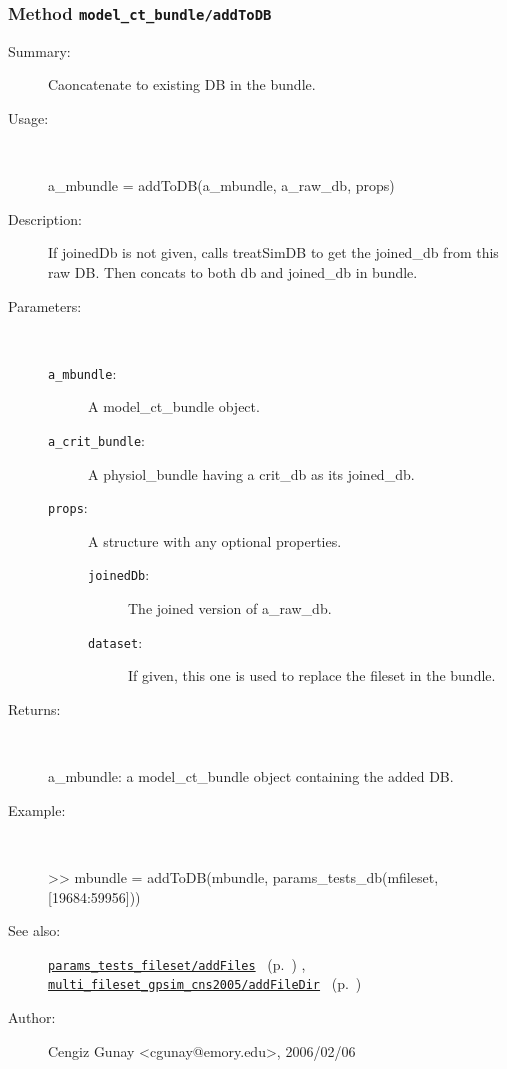 \subsubsection[Method \texttt{addToDB}]{Method \texttt{model\_ct\_bundle/addToDB}}%
%
\label{ref_model_ct_bundle__addToDB}%
\hypertarget{ref_model_ct_bundle__addToDB}{}%
\begin{description}
\item[Summary:]Caoncatenate to existing DB in the bundle.
%
\item[Usage:]~%
\begin{lyxcode}%
a\_mbundle = addToDB(a\_mbundle, a\_raw\_db, props)
%
\end{lyxcode}%
%
\item[Description:]%
If joinedDb is not given, calls treatSimDB to get the joined\_db from this raw DB. 
 Then concats to both db and joined\_db in bundle.
\item[Parameters:]~
\begin{description}%
\item[\texttt{a\_mbundle}:]
 A model\_ct\_bundle object.
\item[\texttt{a\_crit\_bundle}:]
 A physiol\_bundle having a crit\_db as its joined\_db.
\item[\texttt{props}:]
 A structure with any optional properties.
\begin{description}%
\item[\texttt{joinedDb}:]
 The joined version of a\_raw\_db.
\item[\texttt{dataset}:]
 If given, this one is used to replace the fileset in the bundle.
\end{description}%
\end{description}%
%
\item[Returns:]~

	a\_mbundle: a model\_ct\_bundle object containing the added DB.
%
\item[Example:]~
\begin{lyxcode} >> mbundle = addToDB(mbundle, params\_tests\_db(mfileset, [19684:59956]))\\%
\end{lyxcode}
%
\item[See also:]%
\hyperlink{ref_params_tests_fileset__addFiles}{\texttt{params\_tests\_fileset/addFiles}}%
\ (p.~\pageref{ref_params_tests_fileset__addFiles})%
%
, \hyperlink{ref_multi_fileset_gpsim_cns2005__addFileDir}{\texttt{multi\_fileset\_gpsim\_cns2005/addFileDir}}%
\ (p.~\pageref{ref_multi_fileset_gpsim_cns2005__addFileDir})%
%
%
\item[Author:]%
Cengiz Gunay <cgunay@emory.edu>, 2006/02/06%
\end{description}
\methodline%
